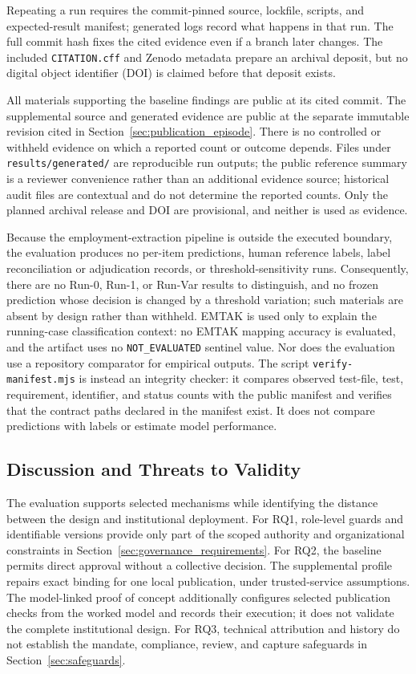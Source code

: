 \documentclass[journal]{IEEEtran}
\begin{document}
Repeating a run requires the commit-pinned source, lockfile, scripts, and
expected-result manifest; generated logs record what happens in that run.
The full commit hash fixes the cited evidence even if a branch later changes.
The included \texttt{CITATION.cff} and Zenodo metadata prepare an archival
deposit, but no digital object identifier (DOI) is claimed before that
deposit exists.

All materials supporting the baseline findings are public at its cited
commit. The supplemental source and generated evidence are public at the
separate immutable revision cited in Section~\ref{sec:publication_episode}. There is no controlled or withheld
evidence on which a reported count or outcome depends. Files under
\texttt{results/generated/} are reproducible run outputs; the public reference
summary is a reviewer convenience rather than an additional evidence source;
historical audit files are contextual and do not determine the reported
counts. Only the planned archival release and DOI are provisional, and neither
is used as evidence.

Because the employment-extraction pipeline is outside the executed boundary,
the evaluation produces no per-item predictions, human reference labels,
label reconciliation or adjudication records, or threshold-sensitivity runs.
Consequently, there are no Run-0, Run-1, or Run-Var results to distinguish,
and no frozen prediction whose decision is changed by a threshold variation;
such materials are absent by design rather than withheld. EMTAK is used only
to explain the running-case classification context: no EMTAK mapping accuracy
is evaluated, and the artifact uses no \texttt{NOT\_EVALUATED} sentinel value.
Nor does the evaluation use a repository comparator for empirical outputs.
The script \texttt{verify-manifest.mjs} is instead an integrity checker: it
compares observed test-file, test, requirement, identifier, and status counts
with the public manifest and verifies that the contract paths declared in the
manifest exist. It
does not compare predictions with labels or estimate model performance.

\subsection{Discussion and Threats to Validity}
\label{sec:discussion}

The evaluation supports selected mechanisms while identifying the distance between the design and institutional deployment. For RQ1, role-level guards and identifiable versions provide only part of the scoped authority and organizational constraints in Section~\ref{sec:governance_requirements}. For RQ2, the baseline permits direct approval without a collective decision. The supplemental profile repairs exact binding for one local publication, under trusted-service assumptions. The model-linked proof of concept additionally configures selected publication checks from the worked model and records their execution; it does not validate the complete institutional design. For RQ3, technical attribution and history do not establish the mandate, compliance, review, and capture safeguards in Section~\ref{sec:safeguards}.
\end{document}
